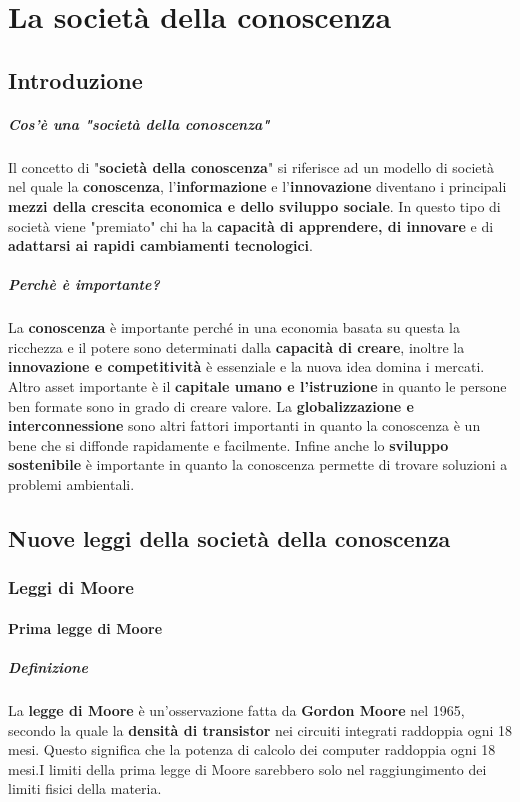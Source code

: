 \chapter{La società della conoscenza}
\thispagestyle{chapterInit}
\section{Introduzione}
    \paragraph{Cos'è una "società della conoscenza"} Il concetto di "\textbf{società della conoscenza}" si riferisce ad un modello di società nel quale la \textbf{conoscenza}, l'\textbf{informazione} e l'\textbf{innovazione} diventano i principali \textbf{mezzi della crescita economica e dello sviluppo sociale}. In questo tipo di società viene "premiato" chi ha la \textbf{capacità di apprendere, di innovare} e di \textbf{adattarsi ai rapidi cambiamenti tecnologici}.
    \paragraph{Perchè è importante?} La \textbf{conoscenza} è importante perché in una economia basata su questa la ricchezza e il potere sono determinati dalla \textbf{capacità di creare}, inoltre la \textbf{innovazione e competitività} è essenziale e la nuova idea domina i mercati. Altro asset importante è il \textbf{capitale umano e l'istruzione} in quanto le persone ben formate sono in grado di creare valore. La \textbf{globalizzazione e interconnessione} sono altri fattori importanti in quanto la conoscenza è un bene che si diffonde rapidamente e facilmente. Infine anche lo \textbf{sviluppo sostenibile} è importante in quanto la conoscenza permette di trovare soluzioni a problemi ambientali.
\section{Nuove leggi della società della conoscenza}
    \subsection{Leggi di Moore}
        \subsubsection{Prima legge di Moore}
            \paragraph{Definizione} La \textbf{legge di Moore} è un'osservazione fatta da \textbf{Gordon Moore} nel 1965, secondo la quale la \textbf{densità di transistor} nei circuiti integrati raddoppia ogni 18 mesi. Questo significa che la potenza di calcolo dei computer raddoppia ogni 18 mesi.\newline I limiti della prima legge di Moore sarebbero solo nel raggiungimento dei limiti fisici della materia.
